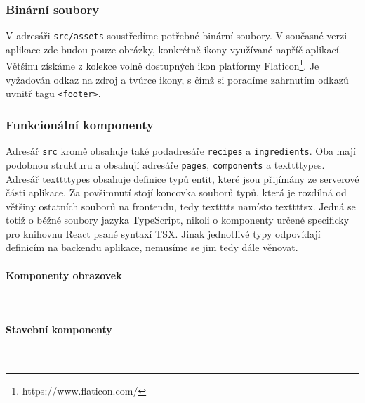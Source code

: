 \subsubsection{Binární soubory}

V adresáři \texttt{src/assets} soustředíme potřebné binární soubory. V současné verzi aplikace zde budou pouze obrázky, konkrétně ikony využívané napříč aplikací. Většinu získáme z kolekce volně dostupných ikon platformy Flaticon\footnote{https://www.flaticon.com/}. Je vyžadován odkaz na zdroj a tvůrce ikony, s čímž si poradíme zahrnutím odkazů uvnitř tagu \texttt{<footer>}.

\subsubsection{Funkcionální komponenty}

Adresář \texttt{src} kromě obsahuje také podadresáře \texttt{recipes} a \texttt{ingredients}. Oba mají podobnou strukturu a obsahují adresáře \texttt{pages}, \texttt{components} a texttt{types}. Adresář texttt{types} obsahuje definice typů entit, které jsou přijímány ze serverové části aplikace. Za povšimnutí stojí koncovka souborů typů, která je rozdílná od většiny ostatních souborů na frontendu, tedy texttt{ts} namísto texttt{tsx}. Jedná se totiž o běžné soubory jazyka TypeScript, nikoli o komponenty určené specificky pro knihovnu React psané syntaxí TSX. Jinak jednotlivé typy odpovídají definicím na backendu aplikace, nemusíme se jim tedy dále věnovat.

\paragraph{Komponenty obrazovek}\mbox{}\\




\paragraph{Stavební komponenty}\mbox{}\\